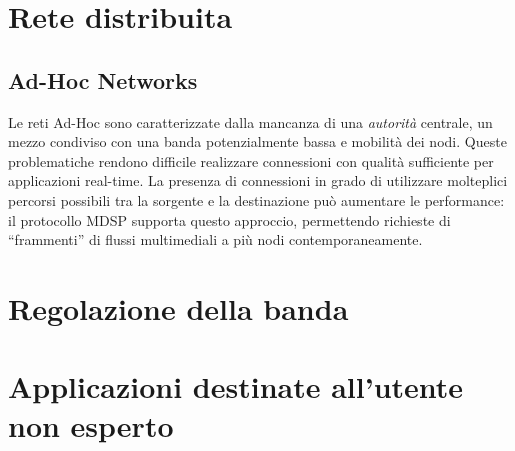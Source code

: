 \section{Rete distribuita}

\subsection{Ad-Hoc Networks}
Le reti Ad-Hoc sono caratterizzate dalla mancanza di una \emph{autorità}
centrale, un mezzo condiviso con una banda potenzialmente bassa e mobilità
dei nodi. Queste problematiche rendono difficile realizzare connessioni con
qualità sufficiente per applicazioni real-time.
La presenza di connessioni in grado di utilizzare molteplici percorsi possibili
tra la sorgente e la destinazione può aumentare le performance: il protocollo
MDSP supporta questo approccio, permettendo richieste di ``frammenti'' di
flussi multimediali a più nodi contemporaneamente.

\section{Regolazione della banda}

\section{Applicazioni destinate all'utente non esperto}